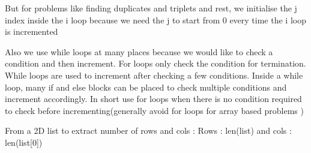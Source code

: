 \documentclass{article}
\newcommand{\nd}{\noindent}
\begin{document}
\nd But for problems like finding duplicates and triplets and rest, we initialise the j index inside the i loop because we need the j to start from 0 every time the i loop is incremented

\nd Also we use while loops at many places because we would like to check a condition and then increment. For loops only check the condition for termination. While loops are used to increment after checking a few conditions. Inside a while loop, many if and else blocks can be placed to check multiple conditions and increment accordingly. In short use for loops when there is no condition required to check before incrementing(generally avoid for loops for array based problems )

\nd From a 2D list to extract number of rows and cols : Rows : len(list) and cols : len(list[0])
\end{document}
